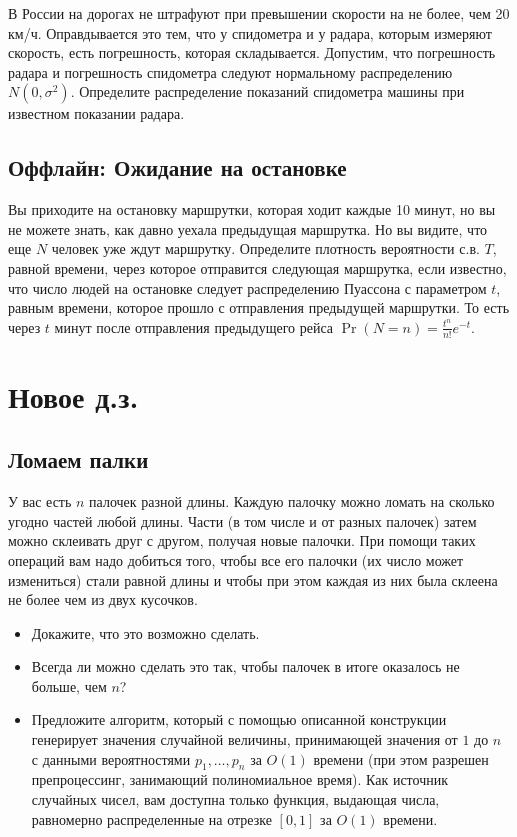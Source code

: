 \documentclass[12pt]{article}
\begin{document}
В России на дорогах не штрафуют при превышении скорости на не более, чем 20 км/ч. Оправдывается это тем, что у спидометра и у радара, которым измеряют скорость, есть погрешность, которая складывается. Допустим, что погрешность радара и погрешность спидометра следуют нормальному распределению $N(0, \sigma^2)$. Определите распределение показаний спидометра машины при известном показании радара.

\subsection{Оффлайн: Ожидание на остановке}

Вы приходите на остановку маршрутки, которая ходит каждые 10 минут, но вы не можете знать, как давно уехала предыдущая маршрутка. Но вы видите, что еще $N$ человек уже ждут маршрутку. Определите плотность вероятности с.в. $T$, равной времени, через которое отправится следующая маршрутка, если известно, что число людей на остановке следует распределению Пуассона с параметром $t$, равным времени, которое прошло с отправления предыдущей маршрутки. То есть через $t$ минут после отправления предыдущего рейса $\Pr(N = n) = \frac{t^n}{n!}e^{-t}$.  

\section{Новое д.з.}

\subsection{Ломаем палки}

У вас есть $n$ палочек разной длины. Каждую палочку можно ломать на сколько угодно частей любой длины. Части (в том числе и от разных палочек) затем можно склеивать друг с другом, получая новые палочки. При помощи таких операций вам надо добиться того, чтобы все его палочки (их число может измениться) стали равной длины и чтобы при этом каждая из них была склеена не более чем из двух кусочков.
\begin{itemize}
    \item Докажите, что это возможно сделать.
    \item Всегда ли можно сделать это так, чтобы палочек в итоге оказалось не больше, чем $n$?
    \item Предложите алгоритм, который с помощью описанной конструкции генерирует значения случайной величины, принимающей значения от $1$ до $n$ с данными вероятностями $p_1, \dots, p_n$ за $O(1)$ времени (при этом разрешен препроцессинг, занимающий полиномиальное время). Как источник случайных чисел, вам доступна только функция, выдающая числа, равномерно распределенные на отрезке $[0, 1]$ за $O(1)$ времени. 
\end{itemize}
\end{document}
